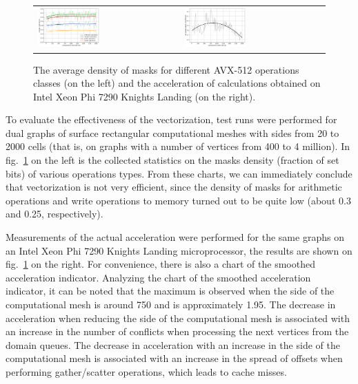 \documentclass[
11pt,%
tightenlines,%
twoside,%
onecolumn,%
nofloats,%
nobibnotes,%
nofootinbib,%
superscriptaddress,%
noshowpacs,%
centertags]%
{revtex4}
\begin{document}
\begin{figure}[h]
\setcaptionmargin{5mm}
\onelinecaptionsfalse %
\begin{tabular}{ll}
\includegraphics[width=0.45\textwidth]{pics/chart_statistics_eng.png}
&
\includegraphics[width=0.45\textwidth]{pics/chart_speedup_eng.png}
\end{tabular}
\caption{The average density of masks for different AVX-512 operations classes (on the left) and the acceleration of calculations obtained on Intel Xeon Phi 7290 Knights Landing (on the right).}\label{fig:chart}
\end{figure}

To evaluate the effectiveness of the vectorization, test runs were performed for dual graphs of surface rectangular computational meshes with sides from 20 to 2000 cells (that is, on graphs with a number of vertices from 400 to 4 million).
In fig.~\ref{fig:chart} on the left is the collected statistics on the masks density (fraction of set bits) of various operations types.
From these charts, we can immediately conclude that vectorization is not very efficient, since the density of masks for arithmetic operations and write operations to memory turned out to be quite low (about 0.3 and 0.25, respectively).

Measurements of the actual acceleration were performed for the same graphs on an Intel Xeon Phi 7290 Knights Landing microprocessor, the results are shown on fig.~\ref{fig:chart} on the right.
For convenience, there is also a chart of the smoothed acceleration indicator.
Analyzing the chart of the smoothed acceleration indicator, it can be noted that the maximum is observed when the side of the computational mesh is around 750 and is approximately 1.95.
The decrease in acceleration when reducing the side of the computational mesh is associated with an increase in the number of conflicts when processing the next vertices from the domain queues.
The decrease in acceleration with an increase in the side of the computational mesh is associated with an increase in the spread of offsets when performing gather/scatter operations, which leads to cache misses.
\end{document}
